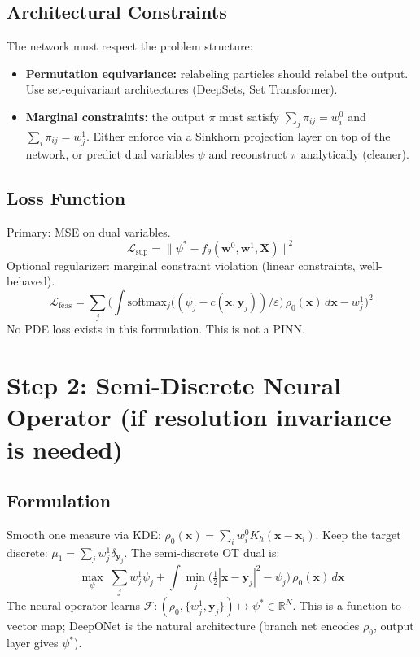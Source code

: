 \documentclass[11pt]{article}
\newcommand{\RR}{\mathbb{R}}
\newcommand{\bw}{\mathbf{w}}
\newcommand{\bx}{\mathbf{x}}
\newcommand{\by}{\mathbf{y}}
\newcommand{\bX}{\mathbf{X}}
\begin{document}
\subsection{Architectural Constraints}

The network must respect the problem structure:
\begin{itemize}[nosep,leftmargin=1.5em]
    \item \textbf{Permutation equivariance:} relabeling particles should relabel the output. Use set-equivariant architectures (DeepSets, Set Transformer).
    \item \textbf{Marginal constraints:} the output $\pi$ must satisfy $\sum_j \pi_{ij} = w^0_i$ and $\sum_i \pi_{ij} = w^1_j$. Either enforce via a Sinkhorn projection layer on top of the network, or predict dual variables $\psi$ and reconstruct $\pi$ analytically (cleaner).
\end{itemize}

\subsection{Loss Function}

Primary: MSE on dual variables.
\[
    \mathcal{L}_{\text{sup}} = \|\psi^* - f_\theta(\bw^0, \bw^1, \bX)\|^2
\]
Optional regularizer: marginal constraint violation (linear constraints, well-behaved).
\[
    \mathcal{L}_{\text{feas}} = \sum_j \Big( \int \text{softmax}_j\big((\hat\psi_j - c(\bx, \by_j))/\varepsilon\big)\,\rho_0(\bx)\,d\bx - w^1_j \Big)^2
\]
No PDE loss exists in this formulation. This is not a PINN.

\section{Step 2: Semi-Discrete Neural Operator (if resolution invariance is needed)}

\subsection{Formulation}

Smooth one measure via KDE: $\rho_0(\bx) = \sum_i w^0_i K_h(\bx - \bx_i)$. Keep the target discrete: $\mu_1 = \sum_j w^1_j \delta_{\by_j}$. The semi-discrete OT dual is:
\[
    \max_\psi \; \sum_j w^1_j \psi_j + \int \min_j \Big(\tfrac{1}{2}|\bx - \by_j|^2 - \psi_j\Big)\,\rho_0(\bx)\,d\bx
\]
The neural operator learns $\mathcal{F}: (\rho_0, \{w^1_j, \by_j\}) \mapsto \psi^* \in \RR^N$. This is a function-to-vector map; DeepONet is the natural architecture (branch net encodes $\rho_0$, output layer gives $\psi^*$).
\end{document}
